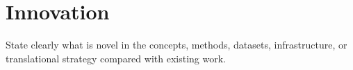 \section{Innovation}

State clearly what is novel in the concepts, methods, datasets,
infrastructure, or translational strategy compared with existing work.
